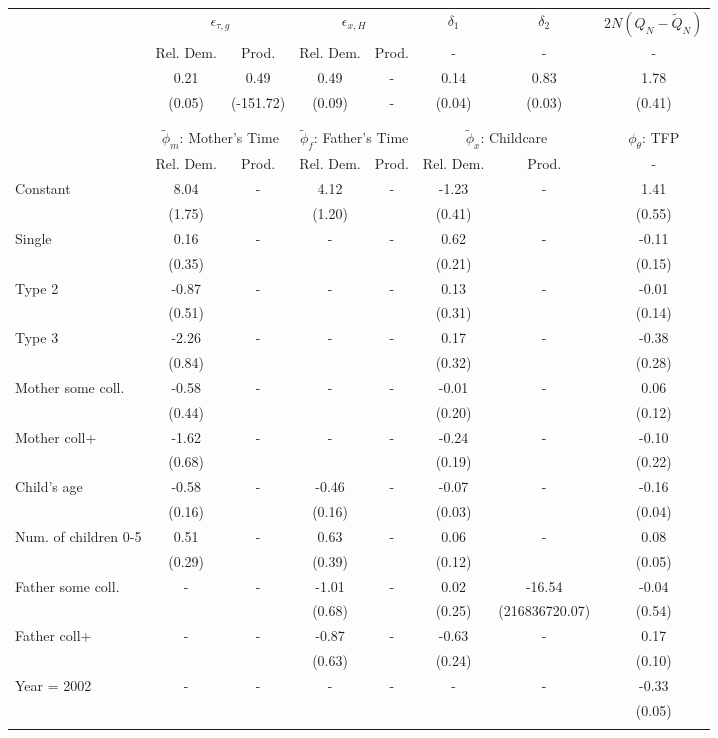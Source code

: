 \begin{tabular}{lccccccc}\toprule
 & \multicolumn{2}{c}{$\epsilon_{\tau,g}$} & \multicolumn{2}{c}{$\epsilon_{x,H}$} & {$\delta_{1}$} & {$\delta_{2}$} & $2N(Q_{N} - \tilde{Q}_{N})$ \\
 & Rel. Dem. & Prod. & Rel. Dem. & Prod. & - & - & - \\\cmidrule(r){2-3}\cmidrule(r){4-5}\cmidrule(r){6-6}\cmidrule(r){7-7}\cmidrule(r){8-8}
&0.21&0.49&0.49& - &0.14&0.83&1.78\\
&(0.05)&(-151.72)&(0.09)& - &(0.04)&(0.03)&(0.41)\\
\\
&&&&&&&\\
 & \multicolumn{2}{c}{$\tilde{\phi}_{m}$: Mother's Time} & \multicolumn{2}{c}{$\tilde{\phi}_{f}$: Father's Time} & \multicolumn{2}{c}{$\tilde{\phi}_{x}$: Childcare} &{$\phi_{\theta}$: TFP} \\
 & Rel. Dem. & Prod. & Rel. Dem. & Prod. & Rel. Dem. & Prod. & -  \\\cmidrule(r){2-3}\cmidrule(r){4-5}\cmidrule(r){6-7}\cmidrule(r){8-8}
Constant&8.04& -&4.12& -&-1.23& -&1.41\\
&(1.75)&&(1.20)&&(0.41)&&(0.55)\\
Single&0.16& -& - & -&0.62& -&-0.11\\
&(0.35)& & &&(0.21)&&(0.15)\\
Type 2&-0.87& -& - & -&0.13& -&-0.01\\
&(0.51)& & &&(0.31)&&(0.14)\\
Type 3&-2.26& -& - & -&0.17& -&-0.38\\
&(0.84)& & &&(0.32)&&(0.28)\\
Mother some coll.&-0.58& -& - & -&-0.01& -&0.06\\
&(0.44)& & &&(0.20)&&(0.12)\\
Mother coll+&-1.62& -& - & -&-0.24& -&-0.10\\
&(0.68)& & &&(0.19)&&(0.22)\\
Child's age&-0.58& -&-0.46& -&-0.07& -&-0.16\\
&(0.16)&&(0.16)&&(0.03)&&(0.04)\\
Num. of children 0-5&0.51& -&0.63& -&0.06& -&0.08\\
&(0.29)&&(0.39)&&(0.12)&&(0.05)\\
Father some coll.& - & -&-1.01& -&0.02&-16.54&-0.04\\
 & &&(0.68)&&(0.25)&(216836720.07)&(0.54)\\
Father coll+& - & -&-0.87& -&-0.63& -&0.17\\
 & &&(0.63)&&(0.24)&&(0.10)\\
Year = 2002& - & -& - & -& - & -&-0.33\\
 & & & & & &&(0.05)\\
\\
\bottomrule\end{tabular}